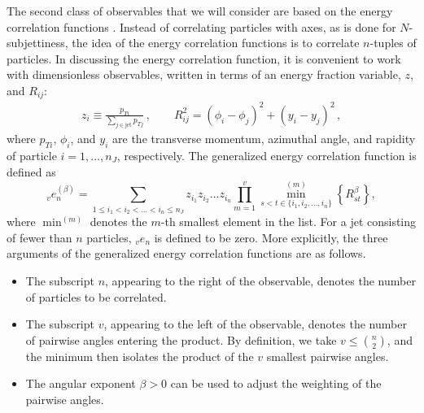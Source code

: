 \documentclass[11pt,letterpaper]{article}
\DeclareRobustCommand{\Ref}[1]{Ref.~\cite{#1}}
\newcommand{\ecfvar}[3]{{_{#1}e_{#2}^{(#3)}}}
\newcommand{\ecfvarnobeta}[2]{{_{#1}e_{#2}}}
\begin{document}
The second class of observables that we will consider are based on the energy correlation functions \cite{Larkoski:2013eya}.
%
Instead of correlating particles with axes, as is done for $N$-subjettiness, the idea of the energy correlation functions is to correlate $n$-tuples of particles.
%
In discussing the energy correlation function, it is convenient to work with dimensionless observables, written in terms of an energy fraction variable, $z$, and $R_{ij}$:
\begin{align}\label{eq:ptratio}  
z_i\equiv\frac{p_{Ti}}{\sum_{j \in \text{jet}} p_{Tj}}\,, \qquad   R_{ij}^2 = (\phi_i-\phi_j)^2+(y_i-y_j)^2\,,
\end{align}
where $p_{Ti}$, $\phi_i$, and $y_i$ are the transverse momentum,
azimuthal angle, and rapidity of particle $i=1,\dots,n_J$, respectively. 
%
%
The generalized energy correlation function is defined as
\begin{equation}\label{eq:ecf_gen}
\ecfvar{v}{n}{\beta} = \sum_{1 \leq i_1 < i_2 < \dots < i_n \leq n_J} z_{i_1} z_{i_2} \dots z_{i_n} \prod_{m = 1}^{v} \min^{(m)}_{s < t \in \{i_1, i_2 , \dots, i_n \}} \left\{ R_{st}^{\beta} \right\},
\end{equation}
where $\min^{(m)}$ denotes the $m$-th smallest element in the list.  For a jet consisting of fewer than $n$ particles, $\ecfvarnobeta{v}{n}$ is defined to be zero.  More explicitly, the three arguments of the generalized energy correlation functions are as follows.
\begin{itemize}
\item The subscript $n$, appearing to the right of the observable, denotes the number of particles to be correlated.   
\item The subscript $v$, appearing to the left of the observable, denotes the number of pairwise angles entering the product.  By definition, we take $v \leq \binom{n}{2}$, and the minimum then isolates the product of the $v$ smallest pairwise angles.
\item The angular exponent $\beta>0$ can be used to adjust the weighting of the pairwise angles.
\end{itemize}
\end{document}
